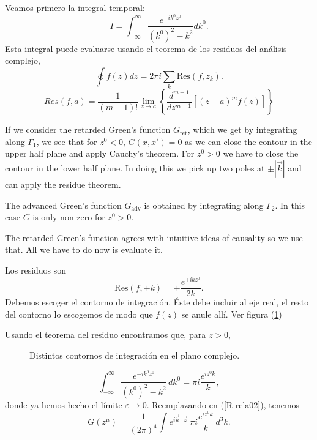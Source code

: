  Veamos primero la integral temporal:%
 \begin{equation}
 I=\int_{-\infty}^{\infty}\frac{e^{-ik^0z^0}}{(k^0)^2-k^2}dk^0.
 \end{equation}
 Esta integral puede evaluarse usando el teorema de los residuos
 del
 análisis complejo,%
 \begin{equation}
 \oint f\left(  z\right)  dz=2\pi i\sum_{k}\text{Res}\left(
 f,z_{k}\right)  .
 \end{equation}
 \begin{equation}
 Res(f,a)=\frac{1}{\left(  m-1\right)
 !}\underset{z\rightarrow a}{\lim}\left\{  \frac{ d^{m-1}}{ d%
 z^{m-1}}\left[  \left(  z-a\right)  ^{m}f\left(  z\right)  \right]  \right\}
 \end{equation}

 If we consider the retarded Green's function $G_{\text{ret}}$,
 which we get by integrating along $\Gamma_1$, we see that
 for $z^0 < 0$, $G(x,x') = 0$ as we can close the contour
 in the upper half plane and apply Cauchy's theorem.  For
 $z^0 > 0$ we have to close the contour in the lower half plane.  In doing
 this we pick up two poles at $\pm |\vec{k}|$ and can apply the residue
 theorem.

 The advanced Green's function $G_{\text{adv}}$ is obtained by
 integrating along $\Gamma_2$.  In this case $G$ is only non-zero
 for $z^0 > 0$.

 The retarded Green's function agrees with intuitive
 ideas of causality so we use that.  All we have to do now is
 evaluate it.

 Los residuos son
 \begin{equation}
 \text{Res}\left(  f,\pm k\right)  =\pm \frac{e^{\mp ikz^0}}{2k}.
 \end{equation}
 Debemos escoger el contorno de integración. \'{E}ste debe
 incluir al eje real, el resto del contorno lo escogemos de modo
 que $f\left(  z\right)  $ se
 anule allí. Ver figura (\ref{contornos})

 Usando el teorema del residuo encontramos que, para $z>0$,
 \begin{figure}[h]
 \centerline{}
 \caption{Distintos contornos de integración en el plano complejo.}
 \label{contornos}
 \end{figure}
 \begin{equation}
 \int_{-\infty}^{\infty}\frac{e^{-ik^0 z^0}}{(k^0)^2-k^2}\,dk^0=\pi
 i\frac{e^{iz^0k}}{k},
 \end{equation}
 donde ya hemos hecho el límite $\varepsilon\rightarrow0$.
 Reemplazando en (\ref{R-rela02}), tenemos%
 \begin{equation}
 G(z^\mu)  =\frac{1}{(2\pi)  ^4}\int
 e^{i\vec{k}\cdot\vec{z}}~\pi i\frac{e^{iz^0k}}{k}~d^3k.
 \end{equation}


